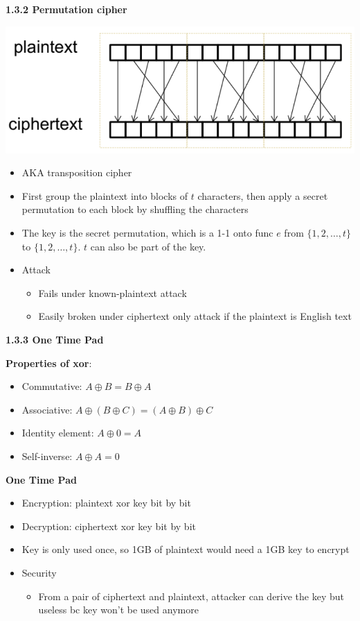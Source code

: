 \documentclass[landscape,a4paper]{extarticle}
\newenvironment{Figure}
  {\par\noindent\minipage{\linewidth}}
  {\endminipage\par\medskip}
\begin{document}
\begin{multicols*}{5}
    \textbf{1.3.2 Permutation cipher}
    \begin{Figure}
        \centering
        \includegraphics[width=\linewidth]{permutation_cipher.png}        
    \end{Figure}
    \begin{itemize}
        \item AKA transposition cipher
        \item First group the plaintext into blocks of $t$ characters, then apply a secret
        permutation to each block by shuffling the characters
        \item The key is the secret permutation, which is a 1-1 onto func $e$ from $\{1, 2, \ldots, t\}$
        to $\{1, 2, \ldots, t\}$. $t$ can also be part of the key.
        \item Attack
        \begin{itemize}
            \item Fails under known-plaintext attack
            \item Easily broken under ciphertext only attack if the plaintext is English text
        \end{itemize}
    \end{itemize}

    \textbf{1.3.3 One Time Pad}

    \textbf{Properties of xor}: 
    \begin{itemize}
        \item Commutative: $A \oplus B = B \oplus A$
        \item Associative: $A \oplus (B \oplus C) = (A \oplus B) \oplus C$
        \item Identity element: $A \oplus 0 = A$
        \item Self-inverse: $A \oplus A = 0$
    \end{itemize}

    \textbf{One Time Pad}
    \begin{itemize}
        \item Encryption: plaintext xor key bit by bit
        \item Decryption: ciphertext xor key bit by bit
        \item Key is only used once, so 1GB of plaintext would need a 1GB key to encrypt
        \item Security
        \begin{itemize}
            \item From a pair of ciphertext and plaintext, attacker can derive the key
            but useless bc key won't be used anymore
        \end{itemize}
    \end{itemize}


\end{multicols*}
\end{document}
